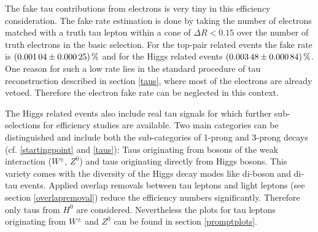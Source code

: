 %
The fake tau contributions from electrons is very tiny in this efficiency consideration. The fake rate estimation is done by taking the number of electrons matched with a truth tau lepton within a cone of $\Delta R<0.15$ over the number of truth electrons in the basic selection. For the top-pair related events the fake rate is $\SI{0.00104\pm 0.00025}{\percent}$ and for the Higgs related events $\SI{0.00348\pm 0.00084}{\percent}$. One reason for such a low rate lies in the standard procedure of tau reconstruction described in section \ref{taus}, where most of the electrons are already vetoed. Therefore the electron fake rate can be neglected in this context.\par
The Higgs related events also include real tau signals for which further sub-selections for efficiency studies are available. Two main categories can be distinguished and include both the sub-categories of 1-prong and 3-prong decays (cf. \ref{startingpoint} and \ref{taus}): Taus originating from bosons of the weak interaction ($W^\pm$, $Z^0$) and taus originating directly from Higgs bosons. This variety comes with the diversity of the Higgs decay modes like di-boson and di-tau events. Applied overlap removals between tau leptons and light leptons (see section \ref{overlapremoval}) reduce the efficiency numbers significantly. Therefore only taus from $H^0$ are considered. Nevertheless the plots for tau leptons originating from $W^\pm$ and $Z^0$ can be found in section \ref{promptplots}. 
%
